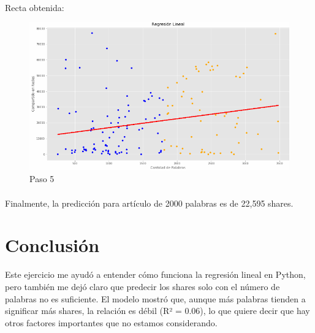 \documentclass{article}
\begin{document}
\paragraph{}Recta obtenida:
\begin{figure}[H]
    \centering
    \includegraphics[width=0.8\linewidth]{img/a9_regresion.png}
    \caption{Paso 5}
    \label{fig:figure2}
\end{figure}

\paragraph{}Finalmente, la predicción para artículo de 2000 palabras es de 22,595 shares.\\

\section{Conclusión}
Este ejercicio me ayudó a entender cómo funciona la regresión lineal en Python, pero también me dejó claro que predecir los shares solo con el número de palabras no es suficiente. El modelo mostró que, aunque más palabras tienden a significar más shares, la relación es débil (R² = 0.06), lo que quiere decir que hay otros factores importantes que no estamos considerando.

\end{document}
